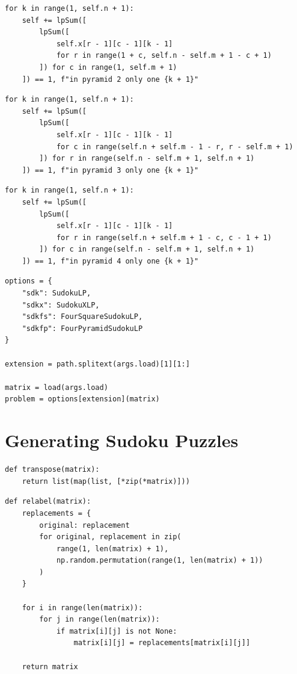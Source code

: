 \documentclass[12pt]{article}
\begin{document}
\begin{lstlisting}[caption={TODO}]
for k in range(1, self.n + 1):
    self += lpSum([
        lpSum([
            self.x[r - 1][c - 1][k - 1]
            for r in range(1 + c, self.n - self.m + 1 - c + 1)
        ]) for c in range(1, self.m + 1)
    ]) == 1, f"in pyramid 2 only one {k + 1}"
\end{lstlisting}

\begin{lstlisting}[caption={TODO}]
for k in range(1, self.n + 1):
    self += lpSum([
        lpSum([
            self.x[r - 1][c - 1][k - 1]
            for c in range(self.n + self.m - 1 - r, r - self.m + 1)
        ]) for r in range(self.n - self.m + 1, self.n + 1)
    ]) == 1, f"in pyramid 3 only one {k + 1}"
\end{lstlisting}

\begin{lstlisting}[caption={TODO}]
for k in range(1, self.n + 1):
    self += lpSum([
        lpSum([
            self.x[r - 1][c - 1][k - 1]
            for r in range(self.n + self.m + 1 - c, c - 1 + 1)
        ]) for c in range(self.n - self.m + 1, self.n + 1)
    ]) == 1, f"in pyramid 4 only one {k + 1}"
\end{lstlisting}

\begin{lstlisting}[caption={TODO}]
options = {
    "sdk": SudokuLP,
    "sdkx": SudokuXLP,
    "sdkfs": FourSquareSudokuLP,
    "sdkfp": FourPyramidSudokuLP
}

extension = path.splitext(args.load)[1][1:]

matrix = load(args.load)
problem = options[extension](matrix)
\end{lstlisting}

\section{Generating Sudoku Puzzles}

\begin{lstlisting}[caption={TODO}]
def transpose(matrix):
    return list(map(list, [*zip(*matrix)]))
\end{lstlisting}

\begin{lstlisting}[caption={TODO}]
def relabel(matrix):
    replacements = {
        original: replacement
        for original, replacement in zip(
            range(1, len(matrix) + 1),
            np.random.permutation(range(1, len(matrix) + 1))
        )
    }

    for i in range(len(matrix)):
        for j in range(len(matrix)):
            if matrix[i][j] is not None:
                matrix[i][j] = replacements[matrix[i][j]]

    return matrix
\end{lstlisting}
\end{document}
